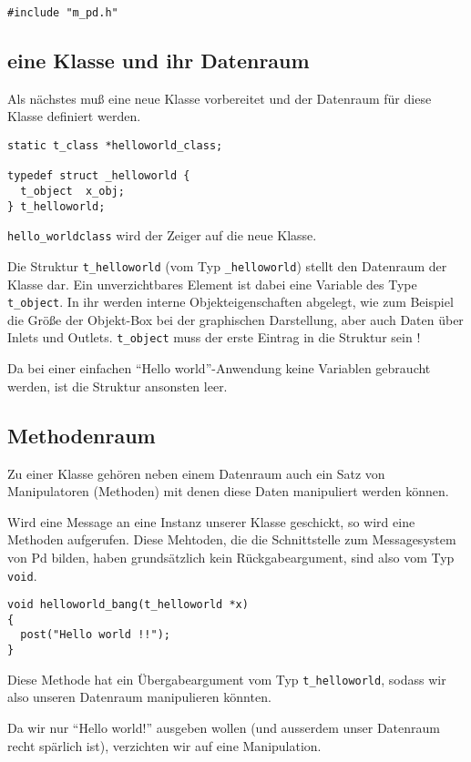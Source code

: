 \documentclass[12pt, a4paper,austrian, titlepage]{article}
\begin{document}
\begin{verbatim}
#include "m_pd.h"
\end{verbatim}


\subsection{eine Klasse und ihr Datenraum}
Als nächstes muß eine neue Klasse vorbereitet und der
Datenraum für diese Klasse definiert werden.

\begin{verbatim}
static t_class *helloworld_class;

typedef struct _helloworld {
  t_object  x_obj;
} t_helloworld;
\end{verbatim}

\verb+hello_worldclass+ wird der Zeiger auf die neue Klasse.

Die Struktur \verb+t_helloworld+ (vom Typ \verb+_helloworld+)
stellt den Datenraum der Klasse dar.
Ein unverzichtbares Element ist dabei eine Variable des Type \verb+t_object+.
In ihr werden interne Objekteigenschaften abgelegt, wie zum Beispiel
die Größe der Objekt-Box bei der graphischen Darstellung, aber auch
Daten über Inlets und Outlets.
\verb+t_object+ muss der erste Eintrag in die Struktur sein !

Da bei einer einfachen ``Hello world''-Anwendung keine Variablen gebraucht werden,
ist die Struktur ansonsten leer.

\subsection{Methodenraum}
Zu einer Klasse gehören neben einem Datenraum auch ein Satz von
Manipulatoren (Methoden) mit denen diese Daten manipuliert werden können.

Wird eine Message an eine Instanz unserer Klasse geschickt,
so wird eine Methoden aufgerufen.
Diese Mehtoden, die die Schnittstelle zum Messagesystem von Pd bilden, 
haben grundsätzlich kein Rückgabeargument, sind also vom Typ \verb+void+.

\begin{verbatim}
void helloworld_bang(t_helloworld *x)
{
  post("Hello world !!");
}
\end{verbatim}

Diese Methode hat ein Übergabeargument vom Typ \verb+t_helloworld+,
sodass wir also unseren Datenraum manipulieren könnten.

Da wir nur ``Hello world!'' ausgeben wollen (und ausserdem unser Datenraum
recht spärlich ist), verzichten wir auf eine Manipulation.
\end{document}
